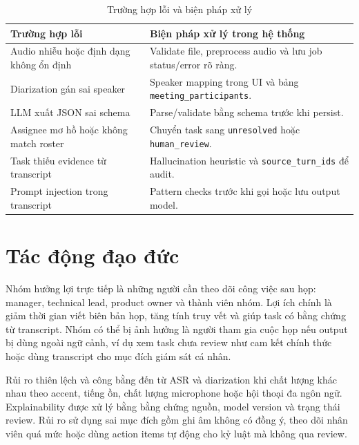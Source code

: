 \begin{table}[H]
\centering
\small
\caption{Trường hợp lỗi và biện pháp xử lý}
\label{tab:robustness}
\begin{tabularx}{\textwidth}{@{}p{3.5cm}X@{}}
\toprule
\textbf{Trường hợp lỗi} & \textbf{Biện pháp xử lý trong hệ thống} \\
\midrule
Audio nhiễu hoặc định dạng không ổn định & Validate file, preprocess audio và lưu job status/error rõ ràng. \\
Diarization gán sai speaker & Speaker mapping trong UI và bảng \texttt{meeting\_participants}. \\
LLM xuất JSON sai schema & Parse/validate bằng schema trước khi persist. \\
Assignee mơ hồ hoặc không match roster & Chuyển task sang \texttt{unresolved} hoặc \texttt{human\_review}. \\
Task thiếu evidence từ transcript & Hallucination heuristic và \texttt{source\_turn\_ids} để audit. \\
Prompt injection trong transcript & Pattern checks trước khi gọi hoặc lưu output model. \\
\bottomrule
\end{tabularx}
\end{table}

\section{Tác động đạo đức}

Nhóm hưởng lợi trực tiếp là những người cần theo dõi công việc sau họp: manager, technical lead, product owner và thành viên nhóm. Lợi ích chính là giảm thời gian viết biên bản họp, tăng tính truy vết và giúp task có bằng chứng từ transcript. Nhóm có thể bị ảnh hưởng là người tham gia cuộc họp nếu output bị dùng ngoài ngữ cảnh, ví dụ xem task chưa review như cam kết chính thức hoặc dùng transcript cho mục đích giám sát cá nhân.

Rủi ro thiên lệch và công bằng đến từ ASR và diarization khi chất lượng khác nhau theo accent, tiếng ồn, chất lượng microphone hoặc hội thoại đa ngôn ngữ. Explainability được xử lý bằng bằng chứng nguồn, model version và trạng thái review. Rủi ro sử dụng sai mục đích gồm ghi âm không có đồng ý, theo dõi nhân viên quá mức hoặc dùng action items tự động cho kỷ luật mà không qua review.
